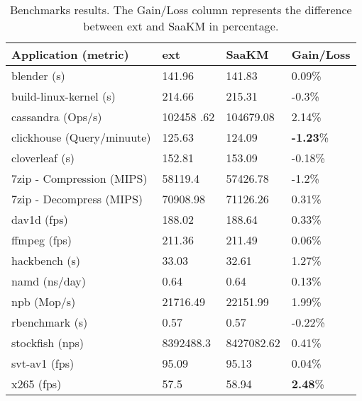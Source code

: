 \begin{table}[htbp]
        \centering
        \caption{Benchmarks results. The Gain/Loss column represents the difference between ext and SaaKM in percentage.}\label{tab:bench-res}
        \begin{tabular}{|l|l|l|l|}
        \hline
                Application (metric) & ext & SaaKM & Gain/Loss \\
                \hline
                        blender (s)& 141.96 & 141.83 & 0.09\% \\
                        build-linux-kernel (s) & 214.66 & 215.31 & -0.3\% \\
                        cassandra (Ops/s) & 102458 .62 & 104679.08 & 2.14\% \\
                        clickhouse (Query/minuute)  & 125.63 & 124.09 & \textbf{-1.23}\% \\
                        cloverleaf (s) & 152.81 & 153.09 & -0.18\% \\
                        7zip - Compression (MIPS) & 58119.4 & 57426.78 & -1.2\% \\
                        7zip - Decompress (MIPS) & 70908.98 & 71126.26 & 0.31\% \\
                        dav1d (fps) & 188.02 & 188.64 & 0.33\% \\
                        ffmpeg (fps) & 211.36 & 211.49 & 0.06\% \\
                        hackbench (s) & 33.03 & 32.61 & 1.27\% \\
                        namd (ns/day) & 0.64 & 0.64 & 0.13\% \\
                        npb (Mop/s)& 21716.49 & 22151.99 & 1.99\% \\
                        rbenchmark (s) & 0.57 & 0.57 & -0.22\% \\
                        stockfish (nps) & 8392488.3 & 8427082.62 & 0.41\% \\
                        svt-av1 (fps) & 95.09 & 95.13 & 0.04\% \\
                        x265 (fps) & 57.5 & 58.94 & \textbf{2.48}\% \\
                \hline
        
\end{tabular}
        

\end{table}
